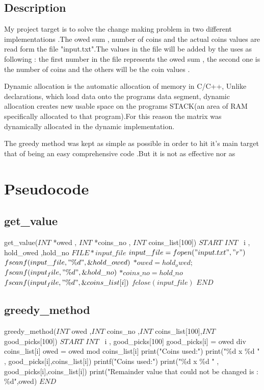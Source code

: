 \documentclass[12]{article}
\begin{document}
\subsection{Description}
\textcolor{white}{}


My project target is to solve the change making problem in two different implementations .The owed sum , number of coins and the actual coins values are read  form the file "input.txt".The values in the file will be added by the uses as following : the first number in the file represents the owed sum , the second one is the number of coins and the others will be the coin values .

Dynamic allocation is the automatic allocation of memory in C/C++, Unlike declarations, which load data onto the programs data segment, dynamic allocation creates new usable space on the programs STACK(an area of RAM specifically allocated to that program).For this reason the matrix was dynamically allocated in the dynamic implementation.

The greedy method was kept as simple as possible in order to hit it's main target that of being an easy comprehensive code .But it is not as effective nor as 

\newpage
\section{Pseudocode}
\subsection{get_value}
\begin{algorithmic}[1]
\STATE get_value($INT$ *owed , $INT$ *coins_no , $INT$ coins_list[100])
\STATE $START$
\STATE $INT$ \ i , hold_owed ,hold_no
\STATE $FILE  *input\_file$
\STATE $input\_file=fopen("input.txt","r")$
\STATE $fscanf( input\_file,"\%d",\&hold\_owed)$
\STATE $*owed = hold_owed;$
\STATE $fscanf( input_file,"\%d",\&hold\_no)$
\STATE $*coins\_no = hold\_no$
\STATE $fscanf( input_file, "\%d", \&coins\_list[i] )$
\ENDFOR
\STATE $fclose(input\_file)$
\STATE $END$
\end{algorithmic}


\subsection{greedy_method}
\begin{algorithmic}[1]
\STATE greedy_method($INT$ owed ,$INT$ coins_no ,$INT$ coins_list[100],$INT$ good_picks[100])
\STATE $START$
\STATE $INT$ \ i , good_picks[100]
\STATE good_picks[i] = owed div coins_list[i]
\STATE owed = owed mod coins_list[i]
\ENDFOR
{}
\STATE print("Coins used:")
\STATE print("\%d x \%d " , good_picks[i],coins_list[i])
\ENDFOR
\ELSE{}
\STATE printf("Coins used:")
\STATE print("\%d x \%d " , good_picks[i],coins_list[i])
\ENDFOR
\STATE print("Remainder value that could not be changed is : \%d",owed)
\ENDIF
\STATE $END$
\end{algorithmic}
\end{document}
